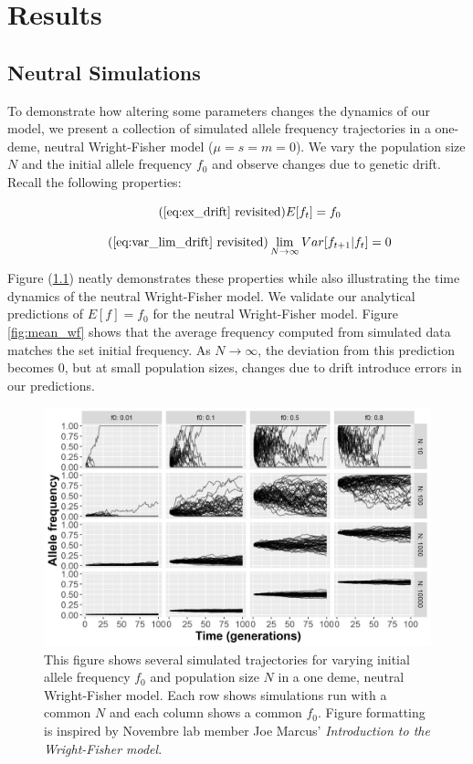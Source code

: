 \chapter{Results}
\section{Neutral Simulations}
To demonstrate how altering some parameters changes the dynamics of our model, we present a collection of simulated allele frequency trajectories in a one-deme, neutral Wright-Fisher model ($\mu = s = m = 0$). We vary the population size $N$ and the initial allele frequency $f_0$ and observe changes due to genetic drift. Recall the following properties:

\begin{equation}
    \tag{\ref{eq:ex_drift} revisited}
    E[f_t] = f_0
\end{equation}

\begin{equation}
    \tag{\ref{eq:var_lim_drift} revisited}
    \lim_{N \to \infty} Var[f_{t+1}|f_t] = 0
\end{equation}


Figure (\ref{fig:neutral_wf}) neatly demonstrates these properties while also illustrating the time dynamics of the neutral Wright-Fisher model. We validate our analytical predictions of $E[f] = f_0$ for the neutral Wright-Fisher model. Figure \ref{fig:mean_wf} shows that the average frequency computed from simulated data matches the set initial frequency. As $N \to \infty$, the deviation from this prediction becomes $0$, but at small population sizes, changes due to drift introduce errors in our predictions. 


\begin{figure}[H]
    \centering
    \includegraphics[scale=0.8]{img/neutral_wf.jpg}
    \caption{This figure shows several simulated trajectories for varying initial allele frequency $f_0$ and population size $N$ in a one deme, neutral Wright-Fisher model. Each row shows simulations run with a common $N$ and each column shows a common $f_0$. Figure formatting is inspired by Novembre lab member Joe Marcus' \textit{Introduction to the Wright-Fisher model}.\cite{marcus_introduction_2016}}
    \label{fig:neutral_wf}
\end{figure}


